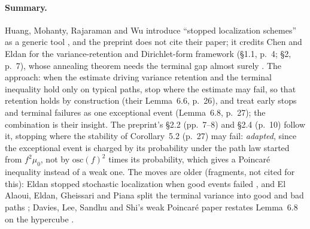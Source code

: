 \documentclass[11pt]{article}
\newcommand{\ploc}[2]{#1}
\newcommand{\sloc}[2]{\cite[#2]{#1}}
\newcommand{\rel}[1]{\textit{#1}}
\begin{document}
\paragraph{Summary.}
Huang, Mohanty, Rajaraman and Wu introduce ``stopped localization schemes''
as a generic tool \sloc{HuangEtAl2024-WeakPoincareSimulatedAnnealing}{\S6, pp.~25--27},
and the preprint does not cite their paper; it credits Chen and Eldan for the
variance-retention and Dirichlet-form framework
(\ploc{\S1.1, p.~4}{introduction.tex:105--110}; \ploc{\S2, p.~7}{observation.tex:7--9}),
whose annealing theorem needs the terminal gap almost surely
\sloc{ChenEldan2022-LocalizationSchemes}{Thm~46, p.~32}.
The approach: when the estimate driving variance retention and the terminal
inequality hold only on typical paths, stop where the estimate may
fail, so that retention holds by construction (their Lemma~6.6, p.~26), and
treat early stops and terminal failures as one exceptional event
(Lemma~6.8, p.~27); the combination is their insight.
The preprint's \ploc{\S2.2 (pp.~7--8)}{observation.tex:45--88} and
\ploc{\S2.4 (p.~10)}{observation.tex:188--205} follow it, stopping where the
stability of \ploc{Corollary~5.2 (p.~27)}{stability.tex:62--97} may fail:
\rel{adapted}, since the exceptional event is charged by its probability under
the path law started from $f^2\mu_0$, not by $\mathrm{osc}(f)^2$ times its
probability, which gives a Poincar\'e inequality instead of a weak one.
The moves are older (fragments, not cited for this): Eldan stopped stochastic
localization when good events failed
\sloc{Eldan2012-ThinShellSpectralGapStochLoc}{\S5, p.~26}, and El Alaoui,
Eldan, Gheissari and Piana split the terminal variance into good and bad paths
\sloc{ElAlaouiEtAl2023-FastRelaxationRFIM}{p.~15}; Davies, Lee, Sandhu and
Shi's weak Poincar\'e paper restates Lemma~6.8 on the hypercube
\sloc{DaviesEtAl2026-WeakPoincareApproxSL}{Thm~5.5, p.~22}.
\end{document}
